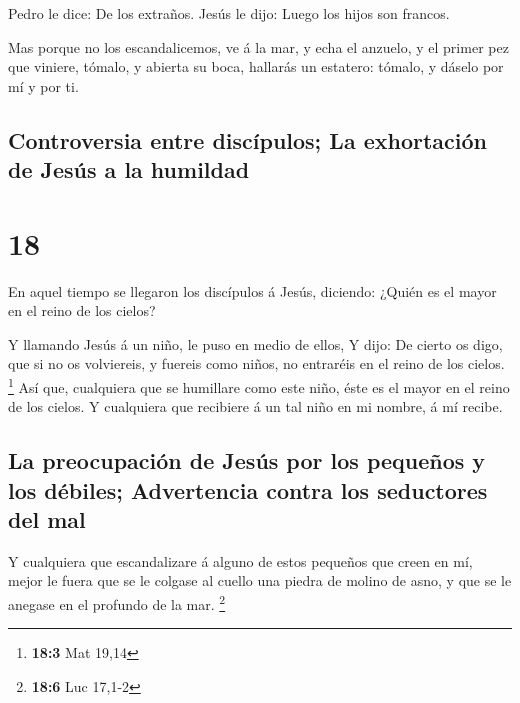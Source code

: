  Pedro le dice: De los extraños. Jesús le dijo: Luego los
hijos son francos.

 Mas porque no los escandalicemos, ve á la mar, y echa el
anzuelo, y el primer pez que viniere, tómalo, y abierta su boca,
hallarás un estatero: tómalo, y dáselo por mí y por ti.

\hypertarget{controversia-entre-discuxedpulos-la-exhortaciuxf3n-de-jesuxfas-a-la-humildad}{%
\subsection{Controversia entre discípulos; La exhortación de Jesús a la
humildad}\label{controversia-entre-discuxedpulos-la-exhortaciuxf3n-de-jesuxfas-a-la-humildad}}

\hypertarget{section-17}{%
\section{18}\label{section-17}}

 En aquel tiempo se llegaron los discípulos á Jesús,
diciendo: ¿Quién es el mayor en el reino de los cielos?

 Y llamando Jesús á un niño, le puso en medio de ellos,
 Y dijo: De cierto os digo, que si no os volviereis, y
fuereis como niños, no entraréis en el reino de los cielos. \footnote{\textbf{18:3}
  Mat 19,14}  Así que, cualquiera que se humillare como este
niño, éste es el mayor en el reino de los cielos.  Y
cualquiera que recibiere á un tal niño en mi nombre, á mí recibe.

\hypertarget{la-preocupaciuxf3n-de-jesuxfas-por-los-pequeuxf1os-y-los-duxe9biles-advertencia-contra-los-seductores-del-mal}{%
\subsection{La preocupación de Jesús por los pequeños y los débiles;
Advertencia contra los seductores del
mal}\label{la-preocupaciuxf3n-de-jesuxfas-por-los-pequeuxf1os-y-los-duxe9biles-advertencia-contra-los-seductores-del-mal}}

 Y cualquiera que escandalizare á alguno de estos pequeños
que creen en mí, mejor le fuera que se le colgase al cuello una piedra
de molino de asno, y que se le anegase en el profundo de la mar.
\footnote{\textbf{18:6} Luc 17,1-2}

